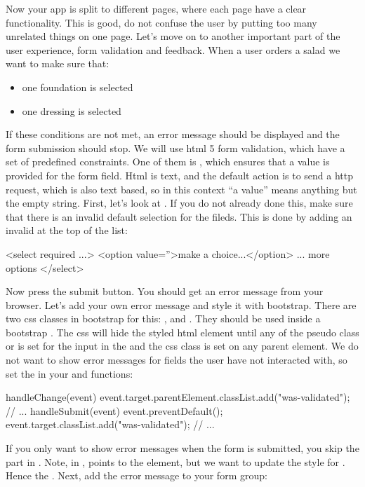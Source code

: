 \documentclass[fleqn, article, a4paper]{memoir}
\begin{document}
\begin{Assignments}
\item Now your app is split to different pages, where each page have a clear functionality. This is good, do not confuse the user by putting too many unrelated things on one page. Let's move on to another important part of the user experience, form validation and feedback. When a user orders a salad we want to make sure that:
\begin{itemize}
  \item one foundation is selected
  \item one dressing is selected
\end{itemize}
If these conditions are not met, an error message should be displayed and the form submission should stop. We will use html 5 form validation, which have a set of predefined constraints. One of them is , which ensures that a value is provided for the form field. Html is text, and the default action is to send a http request, which is also text based, so in this context ``a value'' means anything but the empty string. First, let's look at . If you do not already done this, make sure that there is an invalid default selection for the  fileds. This is done by adding an invalid  at the top of the list:
\begin{Code}
<select required ...>
  <option value=''>make a choice...</option>
  ... more options
</select>
\end{Code}
Now press the submit button. You should get an error message from your browser. Let's add your own error message and style it with bootstrap. There are two css classes in bootstrap for this: , and . They should be used inside a bootstrap . The css will hide the styled html element until any of the pseudo class  or  is set for the input in the  and the css class  is set on any parent element. We do not want to show error messages for fields the user have not interacted with, so set the  in your  and  functions:
\begin{Code}
handleChange(event) {
  event.target.parentElement.classList.add("was-validated");
  // ...
}
handleSubmit(event){
  event.preventDefault();
  event.target.classList.add("was-validated");
  // ...
}
\end{Code}
If you only want to show error messages when the form is submitted, you skip the part in . Note, in ,  points to the  element, but we want to update the style for . Hence the . Next, add the error message to your  form group:

\end{Assignments}
\end{document}

